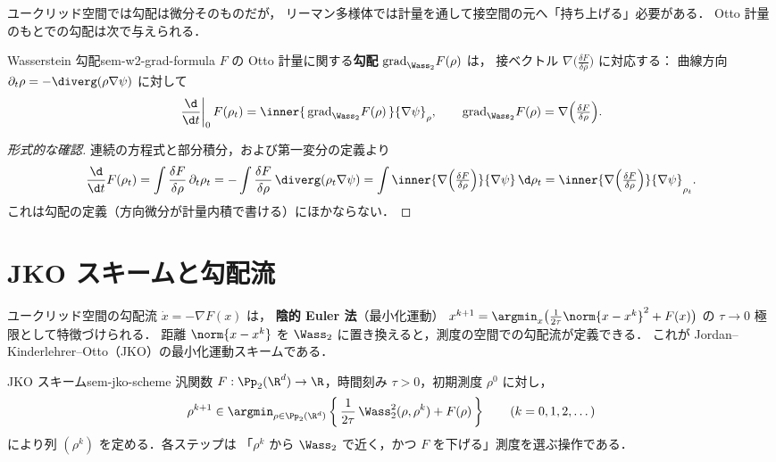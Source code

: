 ユークリッド空間では勾配は微分そのものだが，
リーマン多様体では計量を通して接空間の元へ「持ち上げる」必要がある．
Otto 計量のもとでの勾配は次で与えられる．

\begin{claim}{Wasserstein 勾配}{sem-w2-grad-formula}
  $F$ の Otto 計量に関する\textbf{勾配} $\mathrm{grad}_{\Wass_2}F(\rho)$ は，
  接ベクトル $\nabla\bigl(\tfrac{\delta F}{\delta\rho}\bigr)$ に対応する：
  曲線方向 $\partial_t\rho=-\diverg(\rho\nabla\psi)$ に対して
  \[
    \left.\frac{\d}{\d t}\right|_{0}F(\rho_t)
    = \inner{\,\mathrm{grad}_{\Wass_2}F(\rho)\,}{\nabla\psi}_\rho,
    \qquad
    \mathrm{grad}_{\Wass_2}F(\rho)=\nabla\Bigl(\tfrac{\delta F}{\delta\rho}\Bigr).
  \]
\end{claim}

\begin{proof}[形式的な確認]
  連続の方程式と部分積分，および第一変分の定義より
  \[
    \frac{\d}{\d t}F(\rho_t)
    = \int \frac{\delta F}{\delta\rho}\,\partial_t\rho_t
    = -\int \frac{\delta F}{\delta\rho}\,\diverg(\rho_t\nabla\psi)
    = \int \inner{\nabla\Bigl(\tfrac{\delta F}{\delta\rho}\Bigr)}{\nabla\psi}\,\d\rho_t
    = \inner{\nabla\Bigl(\tfrac{\delta F}{\delta\rho}\Bigr)}{\nabla\psi}_{\rho_t}.
  \]
  これは勾配の定義（方向微分が計量内積で書ける）にほかならない．
\end{proof}

\section{JKO スキームと勾配流}
\label{sec:sem-jko}

ユークリッド空間の勾配流 $\dot x=-\nabla F(x)$ は，
\textbf{陰的 Euler 法}（最小化運動）
$x^{k+1}=\argmin_x\bigl(\tfrac{1}{2\tau}\norm{x-x^k}^2+F(x)\bigr)$ の
$\tau\to0$ 極限として特徴づけられる．
距離 $\norm{x-x^k}$ を $\Wass_2$ に置き換えると，測度の空間での勾配流が定義できる．
これが Jordan--Kinderlehrer--Otto（JKO）の最小化運動スキームである．

\begin{definition}{JKO スキーム}{sem-jko-scheme}
  汎関数 $F:\Pp_2(\R^d)\to\R$，時間刻み $\tau>0$，初期測度 $\rho^0$ に対し，
  \[
    \rho^{k+1}
    \in
    \argmin_{\rho\in\Pp_2(\R^d)}
    \left\{\,
      \frac{1}{2\tau}\,\Wass_2^2(\rho,\rho^k) + F(\rho)
    \,\right\}
    \qquad (k=0,1,2,\dots)
  \]
  により列 $(\rho^k)$ を定める．各ステップは
  「$\rho^k$ から $\Wass_2$ で近く，かつ $F$ を下げる」測度を選ぶ操作である．
\end{definition}


